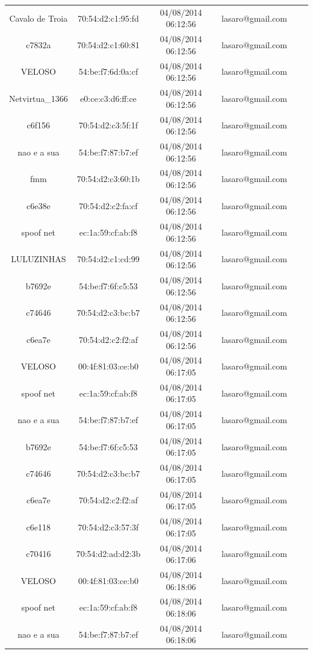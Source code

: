 \documentclass[12pt, %
openright, 
oneside,
a4paper,
brazil]{facom-ufu-abntex2}
\begin{document}
\begin{center}
\begin{longtable}{|c|c|c|c|c|c|}
Cavalo de Troia & 70:54:d2:c1:95:fd & 04/08/2014 06:12:56 & lasaro@gmail.com \\
c7832a & 70:54:d2:c1:60:81 & 04/08/2014 06:12:56 & lasaro@gmail.com \\
VELOSO & 54:be:f7:6d:0a:cf & 04/08/2014 06:12:56 & lasaro@gmail.com \\
Netvirtua\_1366 & e0:ce:c3:d6:ff:ce & 04/08/2014 06:12:56 & lasaro@gmail.com \\
c6f156 & 70:54:d2:c3:5f:1f & 04/08/2014 06:12:56 & lasaro@gmail.com \\
nao e a sua & 54:be:f7:87:b7:ef & 04/08/2014 06:12:56 & lasaro@gmail.com \\
fmm & 70:54:d2:c3:60:1b & 04/08/2014 06:12:56 & lasaro@gmail.com \\
c6e38e & 70:54:d2:c2:fa:cf & 04/08/2014 06:12:56 & lasaro@gmail.com \\
spoof net & ec:1a:59:cf:ab:f8 & 04/08/2014 06:12:56 & lasaro@gmail.com \\
LULUZINHAS & 70:54:d2:c1:cd:99 & 04/08/2014 06:12:56 & lasaro@gmail.com \\
b7692e & 54:be:f7:6f:c5:53 & 04/08/2014 06:12:56 & lasaro@gmail.com \\
c74646 & 70:54:d2:c3:bc:b7 & 04/08/2014 06:12:56 & lasaro@gmail.com \\
c6ea7e & 70:54:d2:c2:f2:af & 04/08/2014 06:12:56 & lasaro@gmail.com \\
VELOSO & 00:4f:81:03:ce:b0 & 04/08/2014 06:17:05 & lasaro@gmail.com \\
spoof net & ec:1a:59:cf:ab:f8 & 04/08/2014 06:17:05 & lasaro@gmail.com \\
nao e a sua & 54:be:f7:87:b7:ef & 04/08/2014 06:17:05 & lasaro@gmail.com \\
b7692e & 54:be:f7:6f:c5:53 & 04/08/2014 06:17:05 & lasaro@gmail.com \\
c74646 & 70:54:d2:c3:bc:b7 & 04/08/2014 06:17:05 & lasaro@gmail.com \\
c6ea7e & 70:54:d2:c2:f2:af & 04/08/2014 06:17:05 & lasaro@gmail.com \\
c6e118 & 70:54:d2:c3:57:3f & 04/08/2014 06:17:05 & lasaro@gmail.com \\
c70416 & 70:54:d2:ad:d2:3b & 04/08/2014 06:17:06 & lasaro@gmail.com \\
VELOSO & 00:4f:81:03:ce:b0 & 04/08/2014 06:18:06 & lasaro@gmail.com \\
spoof net & ec:1a:59:cf:ab:f8 & 04/08/2014 06:18:06 & lasaro@gmail.com \\
nao e a sua & 54:be:f7:87:b7:ef & 04/08/2014 06:18:06 & lasaro@gmail.com \\

\end{longtable}
\end{center}
\end{document}
